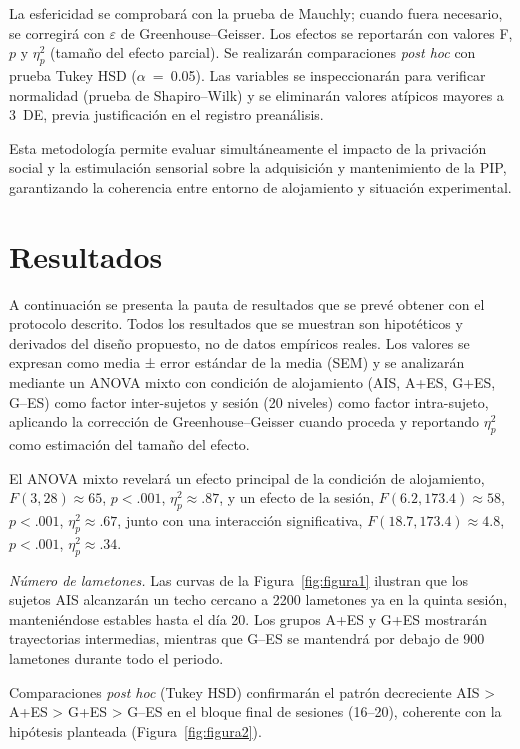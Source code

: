 \documentclass[12pt,a4paper]{article}
\begin{document}
\begin{multicols}{2}
La esfericidad se comprobará con la prueba de Mauchly; cuando fuera necesario, se corregirá con $\varepsilon$ de Greenhouse–Geisser. Los efectos se reportarán con valores F, $p$ y $\eta^2_p$ (tamaño del efecto parcial). Se realizarán comparaciones \textit{post hoc} con prueba Tukey HSD ($\alpha$~=~0.05). Las variables se inspeccionarán para verificar normalidad (prueba de Shapiro--Wilk) y se eliminarán valores atípicos mayores a $3$~DE, previa justificación en el registro preanálisis.


\vspace{2mm}
Esta metodología permite evaluar simultáneamente el impacto de la privación social y la estimulación sensorial sobre la adquisición y mantenimiento de la PIP, garantizando la coherencia entre entorno de alojamiento y situación experimental.



\section{Resultados}

A continuación se presenta la pauta de resultados que se prevé obtener con el protocolo descrito. Todos los resultados que se muestran son hipotéticos y derivados del diseño propuesto, no de datos empíricos reales. Los valores se expresan como media ± error estándar de la media (SEM) y se analizarán mediante un ANOVA mixto con condición de alojamiento (AIS, A+ES, G+ES, G--ES) como factor inter-sujetos y sesión (20 niveles) como factor intra-sujeto, aplicando la corrección de Greenhouse–Geisser cuando proceda y reportando $\eta^2_p$ como estimación del tamaño del efecto.

El ANOVA mixto revelará un efecto principal de la condición de alojamiento, $F(3, 28) \approx 65$, $p < .001$, $\eta^2_p \approx .87$, y un efecto de la sesión, $F(6.2, 173.4) \approx 58$, $p < .001$, $\eta^2_p \approx .67$, junto con una interacción significativa, $F(18.7, 173.4) \approx 4.8$, $p < .001$, $\eta^2_p \approx .34$.

\textit{Número de lametones.} Las curvas de la Figura~\ref{fig:figura1} ilustran que los sujetos AIS alcanzarán un techo cercano a 2200 lametones ya en la quinta sesión, manteniéndose estables hasta el día 20. Los grupos A+ES y G+ES mostrarán trayectorias intermedias, mientras que G--ES se mantendrá por debajo de 900 lametones durante todo el periodo.

Comparaciones \textit{post hoc} (Tukey HSD) confirmarán el patrón decreciente AIS > A+ES > G+ES > G--ES en el bloque final de sesiones (16–20), coherente con la hipótesis planteada (Figura~\ref{fig:figura2}).


\end{multicols}
\end{document}
